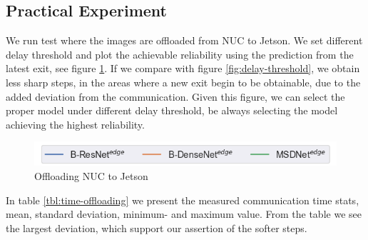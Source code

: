\subsection{Practical Experiment}

We run test where the images are offloaded from NUC to Jetson. We set different delay threshold and plot the achievable reliability using the prediction from the latest exit, see figure \ref{fig:practical-offloading}. If we compare with figure \ref{fig:delay-threshold}, we obtain less sharp steps, in the areas where a new exit begin to be obtainable, due to the added deviation from the communication. Given this figure, we can select the proper model under different delay threshold, be always selecting the model achieving the highest reliability.  

\begin{figure}
	\captionsetup[subfigure]{justification=centering,farskip=1pt,captionskip=1pt}
	\centering
	\includegraphics[width=.7\linewidth]{figures/edge/offloading_legend}
	\hfill
	\caption[Offloading NUC to Jetson]{Offloading NUC to Jetson}
	\label{fig:practical-offloading}
\end{figure}

In table \ref{tbl:time-offloading} we present the measured communication time stats, mean, standard deviation, minimum- and maximum value. From the table we see the largest deviation, which support our assertion of the softer steps.  

